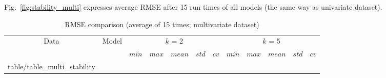 \documentclass[11pt,twoside]{article}
\makeatletter
\newcommand\primitiveinput[1]
		{\@@input #1 }
\makeatother
\begin{document}
\begin{multicols}{2}
Fig.~\ref{fig:stability_multi} expresses average RMSE after 15 run times of all models (the same way as univariate dataset).

\begin{table}[!t]
	\caption{RMSE comparison (average of 15 times; multivariate dataset)}
	\label{table:multi_stability}
	\centering
	\begin{adjustbox}{width=0.45\textwidth, angle=270}
	\begin{sideways}
		\begin{tabular}{| c | c| c | c | c | c | c | c | c | c | c | c |}%
		\hline
			 \multirow{2}{*}{Data} & \multirow{2}{*}{Model} & \multicolumn{5}{c|}{$k$ = 2} & \multicolumn{5}{c|}{ $k$ = 5 } \\ 
			 \cline{3-12}
	   		& & $min$ & $max$ & $mean$ & $std$ & $cv$ &   $min$ & $max$ & $mean$ & $std$ & $cv$ \\ [0.5ex] 
		\hline
			\primitiveinput{table/table_multi_stability}
		\hline
		\end{tabular}
	\end{sideways}
	\end{adjustbox}
\end{table}



\end{multicols}
\end{document}
